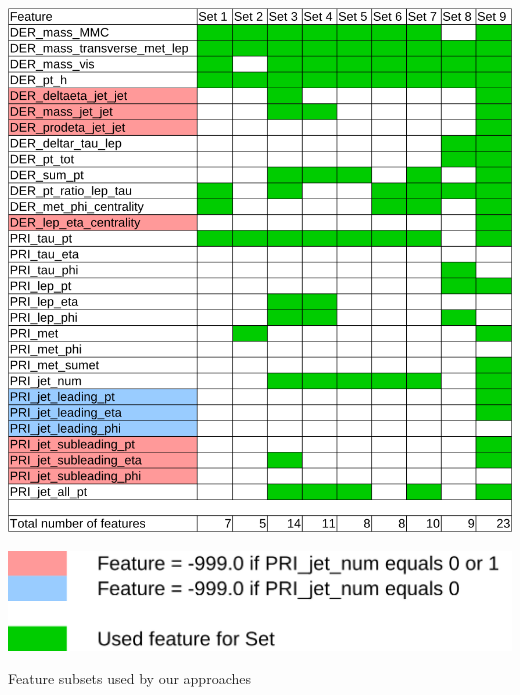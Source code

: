 \begin{table}
\begin{center}
\begin{minipage}{\textwidth}
	\includegraphics[width=\linewidth]{images/featsets}
	\vspace*{0.5\baselineskip}
\end{minipage}
\end{center}
\begin{minipage}{.6\textwidth}
	\includegraphics[width=\linewidth]{images/featsets-legend}
\end{minipage}
\vspace*{\baselineskip}
	\caption{Feature subsets used by our approaches}
	\label{tab:feats}	

\end{table}

